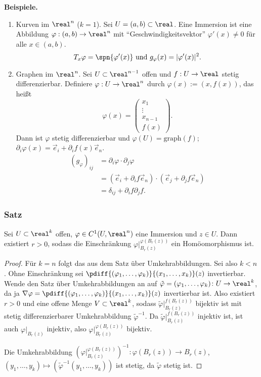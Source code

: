 \documentclass[
 a4paper,
 12pt,
 parskip=half
 ]{scrartcl}
\theoremstyle{plain}
\theoremstyle{definition}
\numberwithin{equation}{section}
\begin{document}
\textbf{Beispiele.}
\begin{enumerate}
 \item Kurven im $\real^n$ ($k=1$). Sei $U = (a,b) \subset \real$. Eine Immersion ist eine Abbildung $\varphi:(a,b) \to \real^n$ mit ``Geschwindigkeitsvektor'' $\varphi'(x) \ne 0$ für alle $x \in (a,b)$.
 \[ T_x \varphi = \spn\{ \varphi'(x)\} \text{ und } g_\varphi(x) = | \varphi'(x) |^2. \]
 \item Graphen im $\real^n$. Sei $U \subset \real^{n-1}$ offen und $f: U \to \real$ stetig differenzierbar. Definiere $\varphi: U \to \real^n$ durch $\varphi(x) := (x, f(x))$, das heißt 
 \[ \varphi(x) = \begin{pmatrix} x_1 \\ \vdots \\ x_{n-1} \\ f(x) \end{pmatrix}. \]
 Dann ist $\varphi$ stetig differenzierbar und $\varphi(U) =  \mathrm{graph}(f)$; $\partial_i \varphi(x) = \vec{e}_i + \partial_i f(x) \vec{e}_n$.
 \[ \begin{aligned}
     (g_\varphi)_{ij} &= \partial_i \varphi \cdot \partial_j \varphi \\
     &= (\vec{e}_i + \partial_i f \vec{e}_n) \cdot (\vec{e}_j + \partial_j f \vec{e}_n) \\
     &= \delta_{ij} + \partial_i f \partial_j f.
    \end{aligned} \]
\end{enumerate}

\subsubsection{Satz}
\begin{thm}
 Sei $U \subset \real^k$ offen, $\varphi \in C^1(U, \real^n)$ eine Immersion und $z \in U$. Dann existiert $r > 0$, sodass die Einschränkung $\varphi|_{B_r(z)}^{\varphi(B_r(z))}$ ein Homöomorphismus ist.
\end{thm}

\begin{proof}
 Für $k = n$ folgt das aus dem Satz über Umkehrabbildungen. Sei also $k < n$. Ohne Einschränkung sei $\pdiff{(\varphi_{1}, \ldots, \varphi_{k})}{(x_1, \ldots, x_k)}(z)$ invertierbar. Wende den Satz über Umkehrabbildungen an auf $\tilde{\varphi} = ( \varphi_1, \ldots, \varphi_k)\colon U \to \real^k$, da ja $\nabla \varphi = \pdiff{(\varphi_{1}, \ldots, \varphi_{k})}{(x_1, \ldots, x_k)}(z)$ invertierbar ist. Also existiert $r > 0$ und eine offene Menge $V \subset \real^k$, sodass $\tilde{\varphi}|_{B_r(z)}^{f(B_r(z))}$ bijektiv ist mit stetig differenzierbarer Umkehrabbildung $\tilde\varphi^{-1}$. Da $\tilde{\varphi}|_{B_r(z)}^{f(B_r(z))}$ injektiv ist, ist auch $\varphi|_{B_r(z)}$ injektiv, also $\varphi|_{B_r(z)}^{\varphi(B_r(z))}$ bijektiv.
 
 Die Umkehrabbildung $\left(\varphi|_{B_r(z)}^{\varphi(B_r(z))}\right)^{-1} \colon \varphi(B_r(z)) \to B_r(z)$, $(y_1, \ldots, y_k) \mapsto (\tilde{\varphi}^{-1}(y_1, \ldots, y_k))$ ist stetig, da $\tilde{\varphi}$ stetig ist.
\end{proof}
\end{document}

